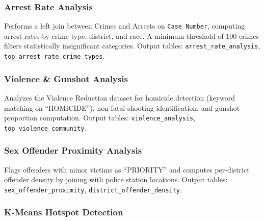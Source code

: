 \documentclass[12pt,a4paper]{article}
\begin{document}
\subsubsection{Arrest Rate Analysis}

Performs a left join between Crimes and Arrests on \texttt{Case Number}, computing arrest rates by crime type, district, and race. A minimum threshold of 100 crimes filters statistically insignificant categories. Output tables: \texttt{arrest\_rate\_analysis}, \texttt{top\_arrest\_rate\_crime\_types}.

\subsubsection{Violence \& Gunshot Analysis}

Analyzes the Violence Reduction dataset for homicide detection (keyword matching on ``HOMICIDE''), non-fatal shooting identification, and gunshot proportion computation. Output tables: \texttt{violence\_analysis}, \texttt{top\_violence\_community}.

\subsubsection{Sex Offender Proximity Analysis}

Flags offenders with minor victims as ``PRIORITY'' and computes per-district offender density by joining with police station locations. Output tables: \texttt{sex\_offender\_proximity}, \texttt{district\_offender\_density}.

\subsubsection{K-Means Hotspot Detection}

\noindent{}
\end{document}

